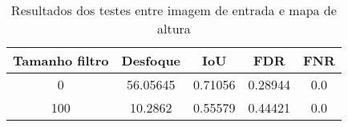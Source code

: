 \begin{table}[ht]
    \centering
    \caption{Resultados dos testes entre imagem de entrada e mapa de altura}
    \label{tab:blur_error_input_output_3d}
    \begin{tabular}{|c|c|c|c|c|}
        \hline
        Tamanho filtro & Desfoque & IoU & FDR & FNR \\
        \hline
        0 & 56.05645 & 0.71056 & 0.28944 & 0.0\\
        100 & 10.2862 & 0.55579 & 0.44421 & 0.0\\
        \hline
    \end{tabular}
\end{table}


